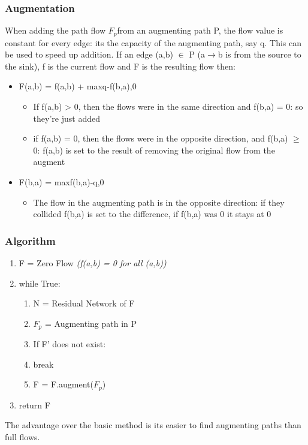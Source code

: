\subsubsection{Augmentation}
When adding the path flow $F_p$from an augmenting path P, the flow value is constant for every edge: its the capacity of the augmenting path, say q. This can be used to speed up addition. If an edge (a,b) $\in$ P (a$\rightarrow$b is from the source to the sink), f is the current flow and F is the resulting flow then:
\begin{itemize}
    \item F(a,b) = f(a,b) + max{q-f(b,a),0}
        \begin{itemize}
            \item If f(a,b) > 0, then the flows were in the same direction and f(b,a) = 0: so they're just added
            \item if f(a,b) = 0, then the flows were in the opposite direction, and f(b,a) $\geq$ 0: f(a,b) is set to the result of removing the original flow from the augment 
        \end{itemize}
    \item F(b,a) = max{f(b,a)-q,0}
        \begin{itemize}
            \item The flow in the augmenting path is in the opposite direction: if they collided f(b,a) is set to the difference, if f(b,a) was 0 it stays at 0
        \end{itemize}    
\end{itemize}

\newpage
\subsubsection{Algorithm}
\begin{enumerate}[label=\Alph*]
    \item F = Zero Flow \emph{(f(a,b) = 0 for all (a,b))}
    \item while True: 
\begin{enumerate}[label=\arabic*]
    \item N = Residual Network of F
    \item $F_p$ = Augmenting path in P
    \item If F' does not exist:
    \item [] \quad break
    \item F = F.augment($F_p$)
\end{enumerate}  
\item return F
\end{enumerate}
The advantage over the basic method is its easier to find augmenting paths than full flows.

